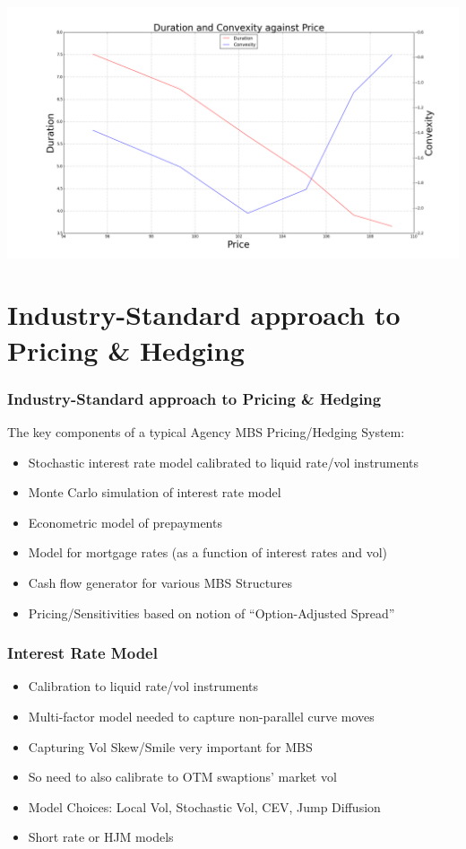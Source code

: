 \documentclass{beamer}
\begin{document}
\begin{frame}
\includegraphics[scale=0.24]{dur_conv_against_price.png}
\end{frame}


\section{Industry-Standard approach to Pricing \& Hedging}

\begin{frame}
\frametitle{Industry-Standard approach to Pricing \& Hedging}
The key components of a typical Agency MBS Pricing/Hedging System:
\begin{itemize}
\item Stochastic interest rate model calibrated to liquid rate/vol instruments
\item Monte Carlo simulation of interest rate model
\item Econometric model of prepayments
\item Model for mortgage rates (as a function of interest rates and vol)
\item Cash flow generator for various MBS Structures
\item Pricing/Sensitivities based on notion of ``Option-Adjusted Spread''
\end{itemize}
\end{frame}

\begin{frame}
\frametitle{Interest Rate Model}
\begin{itemize}
\item Calibration to liquid rate/vol instruments
\item Multi-factor model needed to capture non-parallel curve moves
\item Capturing Vol Skew/Smile very important for MBS
\item So need to also calibrate to OTM swaptions' market vol
\item Model Choices: Local Vol, Stochastic Vol, CEV, Jump Diffusion
\item Short rate or HJM models
\end{itemize}
\end{frame}
\end{document}
